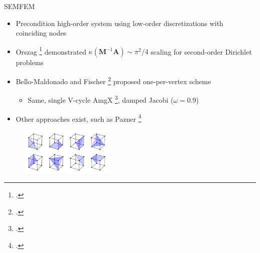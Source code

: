 \begin{frame}{SEMFEM}
  \begin{itemize}
    \item Precondition high-order system using low-order discretizations with coinciding nodes
    \item Orszag \footcite{parter_spectral_1979} demonstrated $\kappa(\mathbf M^{-1} \mathbf A) \sim \pi^2/4$ scaling for second-order Dirichlet problems
    \item Bello-Maldonado and Fischer \footcite{bello-maldonado_scalable_2019} proposed one-per-vertex scheme
    \begin{itemize}
      \item{
        Same, single V-cycle AmgX \footcite{naumov_amgx_2015}, damped Jacobi ($\omega = 0.9$)
        }
    \end{itemize}
    \item Other approaches exist, such as Pazner \footcite{pazner2020efficient}
  \end{itemize}
  \vspace{-0.35cm}
  \begin{figure}
    \includegraphics[width=0.4\textwidth]{../figs/one-tet-per-vertex.png}
  \end{figure}
\end{frame}